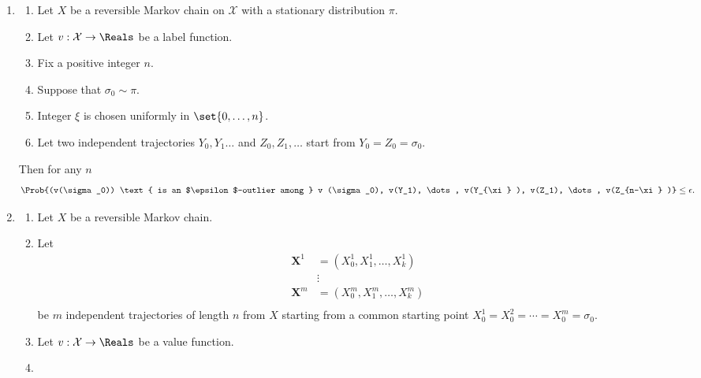 \documentclass[12pt]{article}
\begin{document}
\begin{enumerate}
\begin{theorem}
\end{theorem}
  \item \begin{theorem}
    \label{thm:parallelsignificance:bc1}
    \begin{enumerate}
        \item
            Let \( X \) be a reversible Markov chain on \( \mathcal{X} \)
            with a stationary distribution \( \pi \).
        \item
            Let \( v :  \mathcal{X} \to \Reals \) be a label function.
        \item
            Fix a positive integer \( n \).
        \item
            Suppose that \( \sigma_0 \sim \pi \).
        \item
            Integer \( \xi \) is chosen uniformly in \( \set{0,\dots, n}
            \).
        \item
            Let two independent trajectories \( Y_0 , Y_1 \dots \) and \(
            Z_0, Z_1, \dots \) start from \( Y_0 = Z_0 = \sigma_0 \).
    \end{enumerate}
    Then for any \( n \)
    \[
        \Prob{(v(\sigma_0)) \text{ is an $\epsilon$-outlier among } v
        (\sigma_0), v(Y_1), \dots, v(Y_{\xi} ), v(Z_1), \dots, v(Z_{n-\xi}
        )} \le \epsilon.
    \]
\end{theorem}
  \item \begin{theorem}
    \label{thm:parallelsignificance:thm3point1}
    \begin{enumerate}
        \item
            Let \( X \) be a reversible Markov chain.
        \item
            Let
            \begin{align*}
                \mathbf{X}^1 &= (X_0^1, X_1^1, \dots, X_k^1 )\\
                &\vdots \\
                \mathbf{X}^m &= (X_0^m, X_1^m, \dots, X_k^m )\\
            \end{align*}
            be \( m \) independent trajectories of length \( n \) from \(
            X \) starting from a common starting point \( X_0^1 =
            X_0^2 = \cdots = X_0^m = \sigma_0 \). 
        \item
            Let \( v :  \mathcal{X} \to \Reals \) be a value function.
        \item

\end{enumerate}
\end{theorem}
\end{enumerate}
\end{document}
